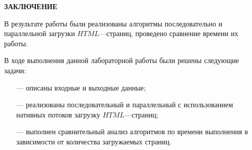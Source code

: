\begin{center}
    \textbf{ЗАКЛЮЧЕНИЕ}
\end{center}

В результате работы были реализованы алгоритмы последовательно и
параллельной загрузки $HTML$---страниц, проведено сравнение времени их работы.

\vspace{5mm}

В ходе выполнения данной лабораторной работы были решены следующие задачи:
\begin{itemize}
	\item[---] описаны входные и выходные данные;
    \item[---] реализованы последовательный и параллельный с использованием нативных потоков загрузку  $HTML$---страниц;
    \item[---] выполнен сравнительный анализ алгоритмов по времени выполнения в зависимости от количества загружаемых страниц.
\end{itemize}